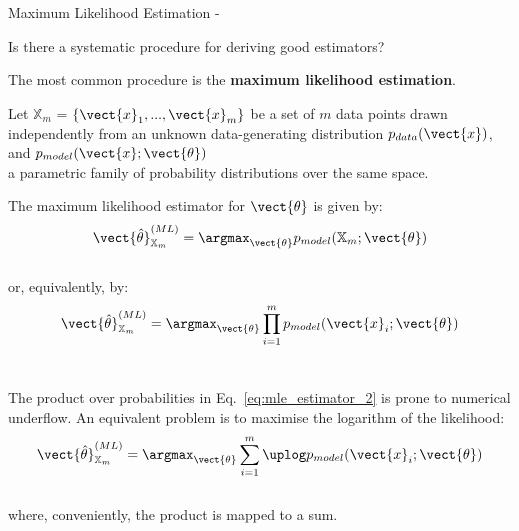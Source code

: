 
\begin{frame}[t,allowframebreaks]{
    Maximum Likelihood Estimation -}

    Is there a systematic procedure for deriving good estimators?\\
    \vspace{0.2cm}

    The most common procedure is the 
    {\bf \gls{maximum likelihood estimation}}.\\
    \vspace{0.2cm}

    Let $\mathbb{X}_{m}$ = $\{\vect{x}_{1}, ..., \vect{x}_{m}\}$ be a set
    of $m$ data points drawn independently from 
    an unknown data-generating distribution $p_{data}(\vect{x})$,
    and $p_{model}(\vect{x};\vect{\theta})$ \\a parametric family of 
    probability distributions over the same space.\\
    \vspace{0.2cm}

    The \gls{maximum likelihood estimator}
    for $\vect{\theta}$ is given by:
    \begin{equation}
        \vect{\hat{\theta}}_{\mathbb{X}_{m}}^{(ML)} = 
        \argmax_{\vect{\theta}} p_{model}(\mathbb{X}_{m};\vect{\theta})
        \label{eq:mle_estimator_1}
    \end{equation}\\

    or, equivalently, by:
    \begin{equation}
        \vect{\hat{\theta}}_{\mathbb{X}_{m}}^{(ML)} = 
        \argmax_{\vect{\theta}} \prod_{i=1}^{m} 
          p_{model}(\vect{x}_{i};\vect{\theta})
        \label{eq:mle_estimator_2}
    \end{equation}\\

    \framebreak


    The product over probabilities in Eq.~\ref{eq:mle_estimator_2} 
    is prone to numerical underflow.
    An equivalent problem is to maximise the logarithm of the likelihood:\\
    \begin{equation}
        \vect{\hat{\theta}}_{\mathbb{X}_{m}}^{(ML)} = 
        \argmax_{\vect{\theta}} \sum_{i=1}^{m} 
          \uplog p_{model}(\vect{x}_{i};\vect{\theta})
        \label{eq:mle_estimator_3}
    \end{equation}\\
    where, conveniently, the product is mapped to a sum.\\


\end{frame}
